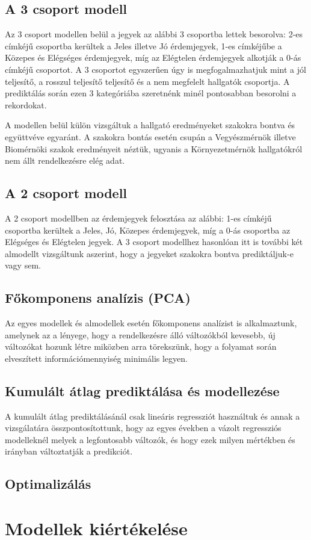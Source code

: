 \documentclass[12pt]{article}
\begin{document}
\subsection{A 3 csoport modell}

Az 3 csoport modellen belül a jegyek az alábbi 3 csoportba lettek besorolva: 2-es címkéjű csoportba kerültek a Jeles illetve Jó érdemjegyek, 1-es címkéjűbe a Közepes és Elégséges érdemjegyek, míg az Elégtelen érdemjegyek alkotják a 0-ás címkéjű csoportot. A 3 csoportot egyszerűen úgy is megfogalmazhatjuk mint a jól teljesítő, a rosszul teljesítő teljesítő és a nem megfelelt hallgatók csoportja. A prediktálás során ezen 3 kategóriába szeretnénk minél pontosabban besorolni a rekordokat.

A modellen belül külön vizsgáltuk a hallgató eredményeket szakokra bontva és együttvéve egyaránt. A szakokra bontás esetén csupán a Vegyészmérnök illetve Biomérnöki szakok eredményeit néztük, ugyanis a Környezetmérnök hallgatókról nem állt rendelkezésre elég adat. 

\subsection{A 2 csoport modell}

A 2 csoport modellben az érdemjegyek felosztása az alábbi: 1-es címkéjű csoportba kerültek a Jeles, Jó, Közepes érdemjegyek, míg a 0-ás csoportba az Elégséges és Elégtelen jegyek. A 3 csoport modellhez hasonlóan itt is további két almodellt vizsgáltunk aszerint, hogy a jegyeket szakokra bontva prediktáljuk-e vagy sem. 

\subsection{Főkomponens analízis (PCA)}

Az egyes modellek és almodellek esetén főkomponens analízist is alkalmaztunk, amelynek az a lényege, hogy a rendelkezésre álló változókból kevesebb, új változókat hozunk létre miközben arra törekszünk, hogy a folyamat során elveszített információmennyiség minimális legyen.

\subsection{Kumulált átlag prediktálása és modellezése}

A kumulált átlag prediktálásánál csak lineáris regressziót használtuk és annak a vizsgálatára összpontosítottunk, hogy az egyes években a vázolt regressziós modelleknél melyek a legfontosabb változók, és hogy ezek milyen mértékben és irányban változtatják a predikciót.

\subsection{Optimalizálás}

\section{Modellek kiértékelése}




\begin{thebibliography}{9}
\end{thebibliography}
\end{document}
